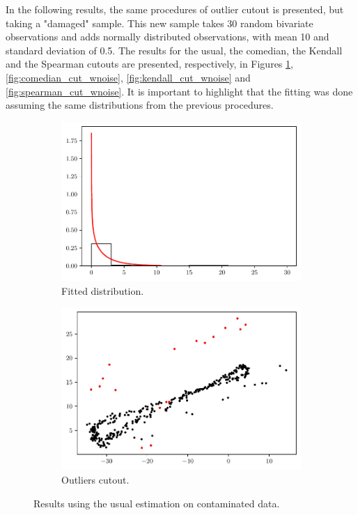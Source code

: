\documentclass[11pt]{article}
\theoremstyle{definition}
\theoremstyle{remark}
\theoremstyle{remark}
\begin{document}
In the following results, the same procedures of outlier cutout is
presented, but taking a "damaged" sample. This new sample takes 30
random bivariate observations and adds normally distributed
observations, with mean 10 and standard deviation of 0.5. The results
for the usual, the comedian, the Kendall and the Spearman cutouts are
presented, respectively, in Figures \ref{fig:nrob_cut_wnoise},
\ref{fig:comedian_cut_wnoise}, \ref{fig:kendall_cut_wnoise} and
\ref{fig:spearman_cut_wnoise}. It is important to highlight that the
fitting was done assuming the same distributions from the previous
procedures.

\begin{figure}[H]
  \centering
  \begin{subfigure}[t]{0.475\textwidth}
    \centering
    \includegraphics[scale=0.45]{../figs/non_robust_hist_with-noise.pdf}
    \caption{Fitted distribution.}
  \end{subfigure}
  \begin{subfigure}[t]{0.475\textwidth}
    \centering
    \includegraphics[scale=0.45]{../figs/non_robust_scatter_with-noise.pdf}
    \caption{Outliers cutout.}
  \end{subfigure}
  \caption{Results using the usual estimation on contaminated data.}
  \label{fig:nrob_cut_wnoise}
\end{figure}
\end{document}
